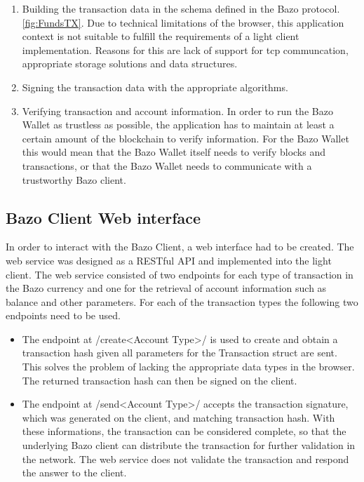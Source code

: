 \begin{enumerate}
\item Building the transaction data in the schema defined in the Bazo protocol. \ref{fig:FundsTX}.
Due to technical limitations of the browser, this application context is not suitable to fulfill the requirements of a light client implementation. Reasons for this are lack of support for tcp communcation, appropriate storage solutions and data structures.

\item Signing the transaction data with the appropriate algorithms.
\item Verifying transaction and account information.
In order to run the Bazo Wallet as trustless as possible, the application has to maintain at least a certain amount of the blockchain to verify information. For the Bazo Wallet this would mean that the Bazo Wallet itself needs to verify blocks and transactions, or that the Bazo Wallet needs to communicate with a trustworthy Bazo client. 
\end{enumerate}


\subsection{Bazo Client Web interface} \label{bazoclientwebinterface}
In order to interact with the Bazo Client, a web interface had to be created. The web service was designed as a RESTful API and implemented into the light client.
The web service consisted of two endpoints for each type of transaction in the Bazo currency and one for the retrieval of account information such as balance and other parameters.
For each of the transaction types the following two endpoints need to be used.
\begin{itemize}
\item The endpoint at /create<Account Type>/ is used to create and obtain a transaction hash given all parameters for the Transaction struct are sent. This solves the problem of lacking the appropriate data types in the browser. The  returned transaction hash can then be signed on the client.
\item The endpoint at /send<Account Type>/ accepts the transaction signature, which was generated on the client, and matching transaction hash. With these informations, the transaction can be considered complete, so that the underlying Bazo client can distribute the transaction for further validation in the network. The web service does not validate the transaction and respond the answer to the client.
\end{itemize}  

